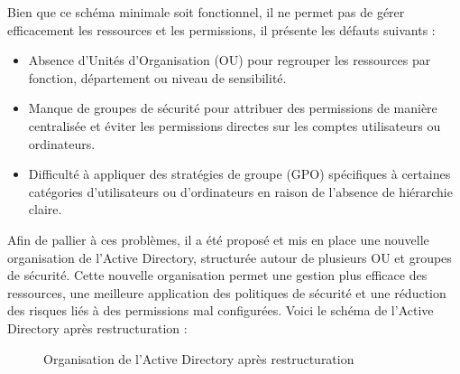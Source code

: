 \documentclass[a4paper, 11pt]{article}
\begin{document}
Bien que ce schéma minimale soit fonctionnel, il ne permet pas de gérer efficacement les ressources et les permissions, il présente les défauts suivants :\\
\begin{itemize}
    \item[$\bullet$] Absence d'Unités d'Organisation (OU) pour regrouper les ressources par fonction, département ou niveau de sensibilité.
    \item[$\bullet$] Manque de groupes de sécurité pour attribuer des permissions de manière centralisée et éviter les permissions directes sur les comptes utilisateurs ou ordinateurs.
    \item[$\bullet$] Difficulté à appliquer des stratégies de groupe (GPO) spécifiques à certaines catégories d'utilisateurs ou d'ordinateurs en raison de l'absence de hiérarchie claire.
\end{itemize}
\par\bigskip


Afin de pallier à ces problèmes, il a été proposé et mis en place une nouvelle organisation de l'Active Directory, structurée autour de plusieurs OU et groupes de sécurité. Cette nouvelle organisation permet une gestion plus efficace des ressources, une meilleure application des politiques de sécurité et une réduction des risques liés à des permissions mal configurées.
Voici le schéma de l'Active Directory après restructuration :\\

\begin{figure}[H]
\centering
{}%
\caption{Organisation de l'Active Directory après restructuration}
\label{fig:ad-restructure}
\end{figure}
\end{document}
